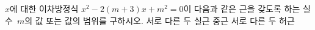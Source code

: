 $x$에 대한 이차방정식 $x^2-2(m+3)x+m^2=0$이 다음과 같은 근을 갖도록 하는 실수~$m$의 값 또는 값의 범위를 구하시오.
 서로 다른 두 실근
 중근
 서로 다른 두 허근

